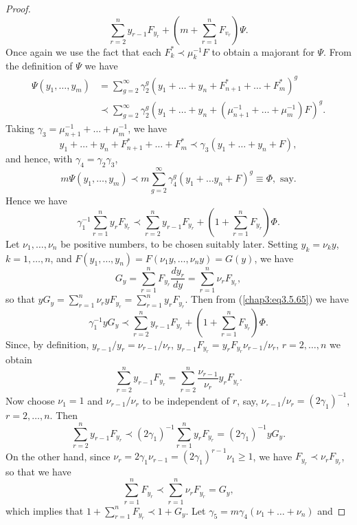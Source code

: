 \begin{proof}
$$\sum\limits^n_{r=2} y_{r-1} F_{y_r} + (m+ \sum\limits^n_{r=1} F_{v_r})
\Psi.  
$$
Once again we use the fact that each $F^*_k \prec \mu^{-1}_k F$ to
obtain a majorant for $\Psi$. From the definition of $\Psi$ we have  
\begin{align*}
 \Psi (y_1,\ldots, y_m) & = \sum\limits^\infty_{g=2} \gamma^{g}_2
 (y_1+ \ldots + y_n + F^*_{n+1} + \ldots + F^*_m)^g\\ 
& \prec \sum\limits^\infty_{g=2} \gamma^g_2 (y_1 + \ldots+ y_n +
 (\mu^{-1}_{n+1}+ \ldots + \mu^{-1}_m) F)^g. 
\end{align*}
Taking $\gamma_3 = \mu^{-1}_{n+1} + \ldots + \mu^{-1}_m$, we have
$$
y_1+ \ldots +y_n + F^*_{n+1} + \ldots + F^*_m \prec \gamma_3 (y_1+
\ldots+ y_n + F), 
$$
and hence, with $\gamma_4 = \gamma_2 \gamma_3$, 
$$
m \Psi (y_1, \ldots, y_m) \prec m \sum\limits^\infty_{g=2} \gamma^g_4
(y_1 + \ldots y_n + F)^g \equiv \Phi , \text{ say}. 
$$
Hence we have
\begin{equation*}
\gamma^{-1}_1 \sum\limits^n_{r=1} y_r F_{y_r} \prec
\sum\limits^n_{r=2} y_{r-1} F_{y_r} + (1+ \sum\limits^n_{r=1} F_{y_r})
\Phi. \tag{3.5.65}\label{chap3:eq3.5.65} 
\end{equation*}
Let $\nu_1, \ldots, \nu_n$ be positive numbers, to be chosen suitably
later. Setting $y_k= \nu_k y$, $k =1, \ldots, n$, and $F(y_1, \ldots,
y_n) = F(\nu_1 y, \ldots, \nu_n y) = G(y)$, we have\pageoriginale 
$$
G_y = \sum\limits^n_{r=1} F_{y_r} \frac{dy_r}{dy} =
\sum\limits^n_{r=1} \nu_r F_{y_r}, 
$$
so that $yG_y = \sum\limits^n_{r=1} \nu_r y F_{y_r} =
\sum\limits^n_{r=1} y_r F_{y_r}$. Then from  (\ref{chap3:eq3.5.65}) we
have  
$$
\gamma^{-1}_1 y G_y \prec \sum\limits^n_{r=2} y_{r-1} F_{y_r} +
\left(1+\sum\limits^n_{r=1} F_{y_r} \right) \Phi.  
$$
Since, by definition, $y_{r-1}/ y_r = \nu_{r-1}/\nu_r$, $y_{r-1}
F_{y_r} = y_r F_{y_r} \nu_{r-1}/ \nu_r$, $r =2, \ldots, n$ we obtain 
$$
\sum\limits^n_{r=2} y_{r-1} F_{y_r} = \sum\limits^n_{r=2}
\frac{\nu_{r-1}}{\nu_r} y_r F_{y_r}.  
$$
Now choose $\nu_1 =1$ and $\nu_{r-1}/ \nu_r$ to be independent of $r$,
say, $\nu_{r-1}/ \nu_r = (2\gamma_1)^{-1}$, $r =2, \ldots, n$. Then 
$$
\sum\limits^n_{r=2} y_{r-1} F_{y_r} \prec (2\gamma_1)^{-1}
\sum\limits^n_{r=1} y_r F_{y_r} = (2\gamma_1)^{-1} y G_y. 
$$
On the other hand, since $\nu_r = 2 \gamma_1 \nu_{r-1} = (2
\gamma_1)^{r-1} \nu_1 \geq 1$, we have $F_{y_r } \prec\nu_r F_{y_r}$,
so that we have  
$$ 
\sum\limits^n_{r=1} F_{y_r} \prec \sum\limits^n_{r=1} \nu_r F_{y_r} =
G_y, 
$$
which implies that $1+ \sum\limits^n_{r=1} F_{y_r} \prec 1 + G_y$. Let
$\gamma_5 = m \gamma_4 (\nu_1+ \ldots + \nu_n)$ and  

\end{proof}
